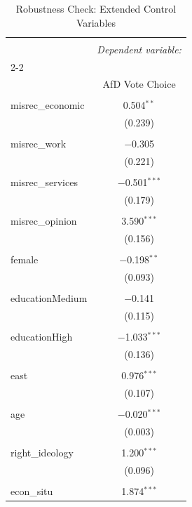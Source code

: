 
\begin{table}[!htbp] \centering 
  \caption{Robustness Check: Extended Control Variables} 
  \label{tab:model5} 
\begin{tabular}{@{\extracolsep{5pt}}lc} 
\\[-1.8ex]\hline 
\hline \\[-1.8ex] 
 & \multicolumn{1}{c}{\textit{Dependent variable:}} \\ 
\cline{2-2} 
\\[-1.8ex] & AfD Vote Choice \\ 
\hline \\[-1.8ex] 
 misrec\_economic & 0.504$^{**}$ \\ 
  & (0.239) \\ 
  & \\ 
 misrec\_work & $-$0.305 \\ 
  & (0.221) \\ 
  & \\ 
 misrec\_services & $-$0.501$^{***}$ \\ 
  & (0.179) \\ 
  & \\ 
 misrec\_opinion & 3.590$^{***}$ \\ 
  & (0.156) \\ 
  & \\ 
 female & $-$0.198$^{**}$ \\ 
  & (0.093) \\ 
  & \\ 
 educationMedium & $-$0.141 \\ 
  & (0.115) \\ 
  & \\ 
 educationHigh & $-$1.033$^{***}$ \\ 
  & (0.136) \\ 
  & \\ 
 east & 0.976$^{***}$ \\ 
  & (0.107) \\ 
  & \\ 
 age & $-$0.020$^{***}$ \\ 
  & (0.003) \\ 
  & \\ 
 right\_ideology & 1.200$^{***}$ \\ 
  & (0.096) \\ 
  & \\ 
 econ\_situ & 1.874$^{***}$ \\ 

\end{tabular}
\end{table}
